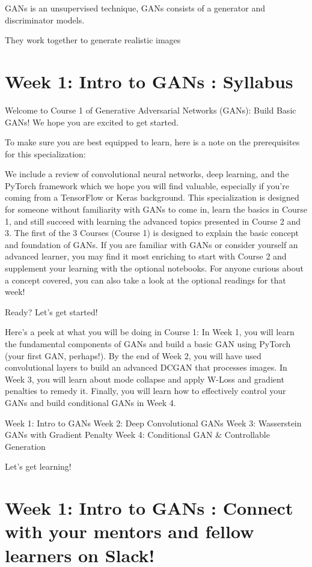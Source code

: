 \documentclass[11pt, onecolumn]{article}
\begin{document}
GANs is an unsupervised technique, GANs consists of a generator and discriminator models.  

They work together to generate realistic images


\section{Week 1: Intro to GANs : Syllabus}

Welcome to Course 1 of Generative Adversarial Networks (GANs): Build Basic GANs! We hope you are excited to get started.

To make sure you are best equipped to learn, here is a note on the prerequisites for this specialization: 

We include a review of convolutional neural networks, deep learning, and the PyTorch framework which we hope you will find valuable, especially if you’re coming from a TensorFlow or Keras background. This specialization is designed for someone without familiarity with GANs to come in, learn the basics in Course 1, and still succeed with learning the advanced topics presented in Course 2 and 3. The first of the 3 Courses (Course 1) is designed to explain the basic concept and foundation of GANs. If you are familiar with GANs or consider yourself an advanced learner, you may find it most enriching to start with Course 2 and supplement your learning with the optional notebooks. For anyone curious about a concept covered, you can also take a look at the optional readings for that week!

Ready? Let's get started!

Here's a peek at what you will be doing in Course 1: In Week 1, you will learn the fundamental components of GANs and build a basic GAN using PyTorch (your first GAN, perhaps!). By the end of Week 2, you will have used convolutional layers to build an advanced DCGAN that processes images. In Week 3, you will learn about mode collapse and apply W-Loss and gradient penalties to remedy it. Finally, you will learn how to effectively control your GANs and build conditional GANs in Week 4.

    Week 1: Intro to GANs
    Week 2: Deep Convolutional GANs
    Week 3: Wasserstein GANs with Gradient Penalty
    Week 4: Conditional GAN \& Controllable Generation

Let's get learning!


\section{Week 1: Intro to GANs : Connect with your mentors and fellow learners on Slack!}
\end{document}
